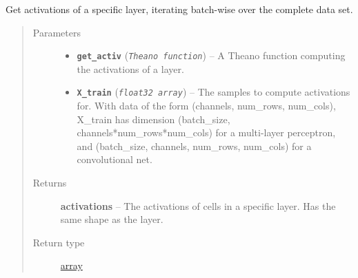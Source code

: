\documentclass[letterpaper,10pt,english]{sphinxmanual}
\begin{document}
\begin{fulllineitems}
\label{core:core.util.get_activations_layer}
Get activations of a specific layer, iterating batch-wise over the complete
data set.
\begin{quote}\begin{description}
\item[{Parameters}] \leavevmode\begin{itemize}
\item {} 
\textbf{\texttt{get\_activ}} (\emph{\texttt{Theano function}}) -- A Theano function computing the activations of a layer.

\item {} 
\textbf{\texttt{X\_train}} (\emph{\texttt{float32 array}}) -- The samples to compute activations for. With data of the form
(channels, num\_rows, num\_cols), X\_train has dimension
(batch\_size, channels*num\_rows*num\_cols) for a multi-layer perceptron,
and (batch\_size, channels, num\_rows, num\_cols) for a convolutional net.

\end{itemize}

\item[{Returns}] \leavevmode
\textbf{activations} -- The activations of cells in a specific layer. Has the same shape as the
layer.

\item[{Return type}] \leavevmode
\href{https://docs.python.org/library/array.html\#module-array}{array}

\end{description}\end{quote}

\end{fulllineitems}

\end{document}
